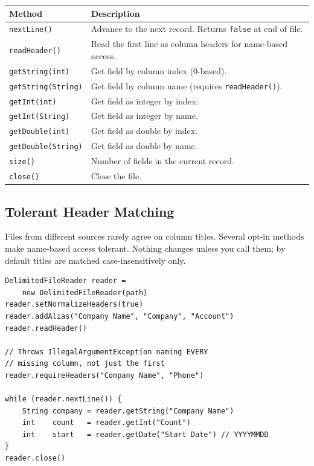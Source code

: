 \begin{longtable}{P{4.5cm}P{6cm}}
\toprule
\textbf{Method} & \textbf{Description} \\
\midrule
\endhead
\texttt{nextLine()} & Advance to the next record.  Returns \texttt{false} at end of file. \\
\texttt{readHeader()} & Read the first line as column headers for name-based access. \\
\texttt{getString(int)} & Get field by column index (0-based). \\
\texttt{getString(String)} & Get field by column name (requires \texttt{readHeader()}). \\
\texttt{getInt(int)} & Get field as integer by index. \\
\texttt{getInt(String)} & Get field as integer by name. \\
\texttt{getDouble(int)} & Get field as double by index. \\
\texttt{getDouble(String)} & Get field as double by name. \\
\texttt{size()} & Number of fields in the current record. \\
\texttt{close()} & Close the file. \\
\bottomrule
\end{longtable}

\subsection{Tolerant Header Matching}
\label{sec:file-csv-headers}

Files from different sources rarely agree on column titles.  Several opt-in methods make name-based access tolerant.  Nothing changes unless you call them; by default titles are matched case-insensitively only.

\begin{lstlisting}[style=groovy]
DelimitedFileReader reader =
    new DelimitedFileReader(path)
reader.setNormalizeHeaders(true)
reader.addAlias("Company Name", "Company", "Account")
reader.readHeader()

// Throws IllegalArgumentException naming EVERY
// missing column, not just the first
reader.requireHeaders("Company Name", "Phone")

while (reader.nextLine()) {
    String company = reader.getString("Company Name")
    int    count   = reader.getInt("Count")
    int    start   = reader.getDate("Start Date") // YYYYMMDD
}
reader.close()
\end{lstlisting}

